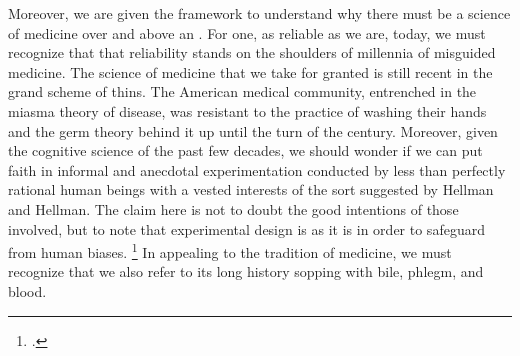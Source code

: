 \documentclass[letterpaper,notitlepage,12pt]{article}
\begin{document}
Moreover, we are given the framework to understand why there must be a science
of medicine over and above an .
For one, as reliable as we are, today, we must recognize that that reliability
stands on the shoulders of millennia of misguided medicine.
The science of medicine that we take for granted is still recent in the grand
scheme of thins.
The American medical community, entrenched in the miasma theory of disease, was
resistant to the practice of washing their hands and the germ theory behind it
up until the turn of the  century.
Moreover, given the cognitive science of the past few decades, we should wonder
if we can put faith in informal and anecdotal experimentation conducted by less
than perfectly rational human beings with a vested interests of the sort
suggested by Hellman and Hellman.
The claim here is not to doubt the good intentions of those involved, but to
note that experimental design is as it is in order to safeguard from human
biases.
\footcite[p. 352]{clifford_ethics_1886}
In appealing to the tradition of medicine, we must recognize that we also refer
to its long history sopping with bile, phlegm, and blood.
\end{document}
